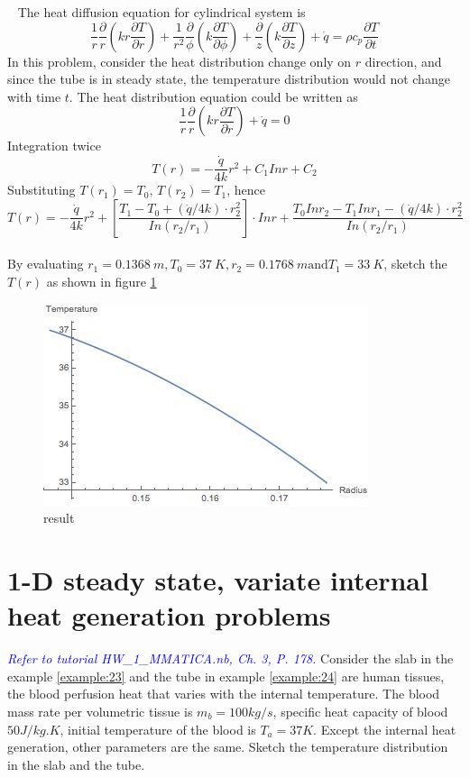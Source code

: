 \begin{solution}
~
The heat diffusion equation for cylindrical system is 
$$ 
\frac{1}{r}\frac{\partial}{r}(kr\frac{\partial T}{\partial r})+
\frac{1}{r^2}\frac{\partial}{\phi}(k\frac{\partial T}{\partial \phi})+
\frac{\partial}{z}(k\frac{\partial T}{\partial z})+
\dot{q} =
\rho c_p\frac{\partial T}{\partial t}
$$
In this problem, consider the heat distribution change only on $r$ direction,
and since the tube is in steady state, the temperature distribution would not
change with time $t$. The heat distribution equation could be written as
$$\frac{1}{r}\frac{\partial}{r}(kr\frac{\partial T}{\partial r})+\dot{q}=0$$
Integration twice
$$T(r)=-\frac{\dot{q}}{4k}r^2+C_1Inr+C_2$$
Substituting $T(r_1)=T_0$, $T(r_2)=T_1$, hence
$$
T(r)=-\frac{\dot{q}}{4k}r^2 +\left[\frac{T_1-T_0+(\dot{q}/4k)\cdot r_2^2}{In(r_2/r_1)} \right]\cdot Inr +
\frac{T_0Inr_2-T_1Inr_1-(\dot{q}/4k)\cdot r_2^2}{In(r_2/r_1)}
$$
~\\
By evaluating $r_1=0.1368~m, T_0=37~K, r_2=0.1768~m \text{and} T_1=33~K$,
sketch the $T(r)$ as shown in figure \ref{fig:2:9}
\begin{figure}[h!]
  \centering
    \includegraphics[scale=0.6]{figures/ch2/9}
    \caption{result}
    \label{fig:2:9}
\end{figure}
\end{solution}

\section{1-D steady state, variate internal	heat generation	problems}
\begin{example}
\textcolor{blue} {\emph{Refer to tutorial HW\_1\_MMATICA.nb, Ch. 3, P. 178.}}
Consider the slab in the example \ref{example:23} and the tube in example
\ref{example:24} are human tissues, the blood perfusion heat that varies with the internal temperature. The blood mass rate per volumetric tissue is $m_b=100kg/s$, specific heat capacity of blood $50J/kg.K$, initial temperature of the blood is 
$T_a=37K$. Except the internal heat generation, other parameters are the same. 
Sketch the temperature distribution in the slab and the tube.
\end{example}

